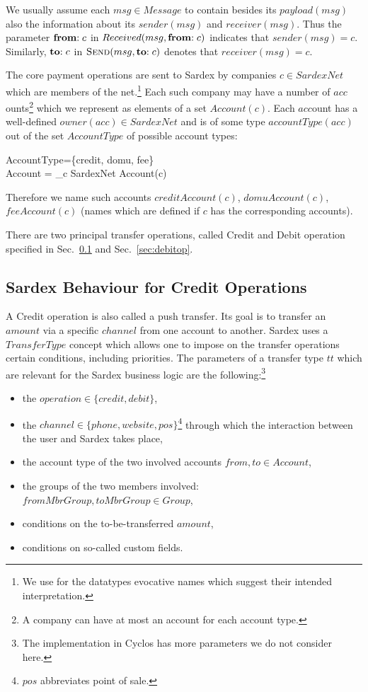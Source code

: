 We usually assume  each $msg \in Message$ to contain besides its $payload(msg)$ also the information about its $sender(msg)$ and $receiver(msg)$. Thus the parameter $\mathrel{\mathbf{from}} :c$ in $Received(msg, \mathrel{\mathbf{from}} :c)$ indicates that $sender(msg)=c$. Similarly, $\mathrel{\mathbf{to}} :c$ in $\hbox{\sc Send}(msg, \mathrel{\mathbf{to}} :c)$ denotes that $receiver(msg) = c$.

The core payment operations are sent to Sardex by companies $c \in SardexNet$ which are members of the net.\footnote{We use for the datatypes evocative names which suggest their intended interpretation.} Each such company may have a number of $acc$ounts\footnote{A company can have at most an account for each account type.} which we represent as elements of a set $Account(c)$. Each $acc$ount has a well-defined $owner(acc) \in SardexNet$ and is of some type $accountType(acc)$ out of the set $AccountType$ of possible account types:

\begin{asm}
AccountType=\{credit, domu, fee\} \\
Account = \bigcup_{c \in SardexNet} Account(c)
\end{asm}
Therefore we name such accounts $creditAccount(c)$, $domuAccount(c)$, $feeAccount(c)$ (names which are defined if $c$ has the corresponding accounts). 

There are two principal transfer operations, called Credit and Debit operation specified in Sec.~\ref{sec:creditop} and Sec.~\ref{sec:debitop}.

\subsection{Sardex Behaviour for Credit Operations}
\label{sec:creditop}

A Credit operation is also called a push transfer. Its goal is to transfer an $amount$ via a specific $channel$ from one account to another. Sardex uses a $TransferType$ concept which allows one to impose on the transfer operations certain conditions, including priorities. The parameters of a transfer type $tt$ which are relevant for the Sardex business logic are the following:\footnote{The implementation in Cyclos has more parameters we do not consider here.}
\begin{itemize}
	\item the $operation \in \{credit, debit\}$,
	\item the $channel \in \{phone,website,pos\}$\footnote{$pos$ abbreviates point of sale.} through which the interaction between the user and Sardex takes place,
	\item the account type of the two involved accounts $from,to \in Account$,
	\item the groups of the two members involved: $fromMbrGroup,toMbrGroup \in Group$,
	\item conditions on the to-be-transferred $amount$, 
	\item conditions on so-called custom fields.
\end{itemize}

